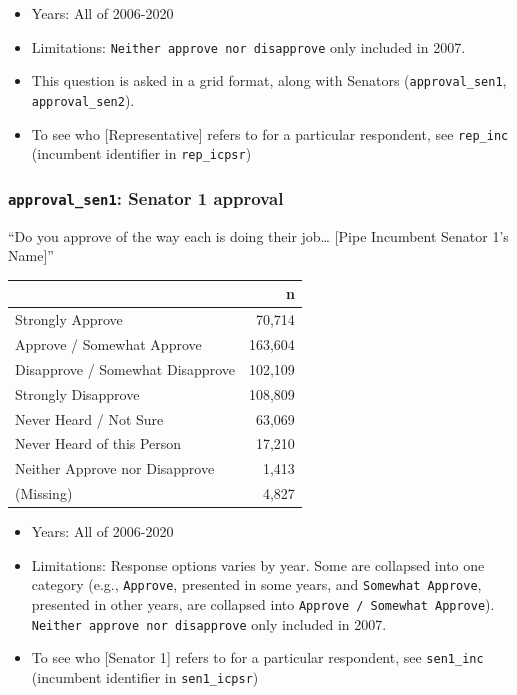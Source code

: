 \documentclass[10pt,article,oneside]{memoir}
\theoremstyle{definition}
\begin{document}
\begin{itemize}
\tightlist
\item
  Years: All of 2006-2020
\item
  Limitations: \texttt{Neither\ approve\ nor\ disapprove} only included
  in 2007.
\item
  This question is asked in a grid format, along with Senators
  (\texttt{approval\_sen1}, \texttt{approval\_sen2}).
\item
  To see who {[}Representative{]} refers to for a particular respondent,
  see \texttt{rep\_inc} (incumbent identifier in \texttt{rep\_icpsr})
\end{itemize}

\hypertarget{approval_sen1-senator-1-approval}{%
\subsubsection{\texorpdfstring{\texttt{approval\_sen1}: Senator 1
approval}{approval\_sen1: Senator 1 approval}}\label{approval_sen1-senator-1-approval}}

``Do you approve of the way each is doing their job\ldots{} {[}Pipe
Incumbent Senator 1's Name{]}''

\begin{table}[H]
\centering
\begin{tabular}{lr}
\toprule
 & n\\
\midrule
Strongly Approve & 70,714\\
Approve / Somewhat Approve & 163,604\\
Disapprove / Somewhat Disapprove & 102,109\\
Strongly Disapprove & 108,809\\
Never Heard / Not Sure & 63,069\\
Never Heard of this Person & 17,210\\
Neither Approve nor Disapprove & 1,413\\
(Missing) & 4,827\\
\bottomrule
\end{tabular}
\end{table}

\begin{itemize}
\tightlist
\item
  Years: All of 2006-2020
\item
  Limitations: Response options varies by year. Some are collapsed into
  one category (e.g., \texttt{Approve}, presented in some years, and
  \texttt{Somewhat\ Approve}, presented in other years, are collapsed
  into \texttt{Approve\ /\ Somewhat\ Approve}).
  \texttt{Neither\ approve\ nor\ disapprove} only included in 2007.
\item
  To see who {[}Senator 1{]} refers to for a particular respondent, see
  \texttt{sen1\_inc} (incumbent identifier in \texttt{sen1\_icpsr})
\end{itemize}
\end{document}
